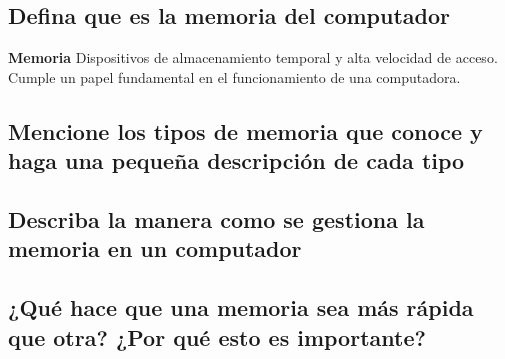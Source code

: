 \documentclass{article}
\begin{document}
\subsection{Defina que es la memoria del computador}


\begin{tcolorbox}[colupper=red!75!black]
	\textbf{Memoria}
	\tcblower
	Dispositivos de almacenamiento temporal y alta velocidad de acceso. Cumple un papel fundamental en el funcionamiento de una computadora.
\end{tcolorbox}

\subsection{Mencione los tipos de memoria que conoce y haga una pequeña descripción de cada tipo}

\begin{tcolorbox}[colupper=red!75!black]
	\textbf{}
	\tcblower
	
\end{tcolorbox}

\subsection{Describa la manera como se gestiona la memoria en un computador}

\begin{tcolorbox}[colupper=red!75!black]
	\textbf{}
	\tcblower
	
\end{tcolorbox}

\subsection{¿Qué hace que una memoria sea más rápida que otra? ¿Por qué esto es importante?}
\begin{tcolorbox}[colupper=red!75!black]
	\textbf{}
	\tcblower
	
\end{tcolorbox}
\end{document}
